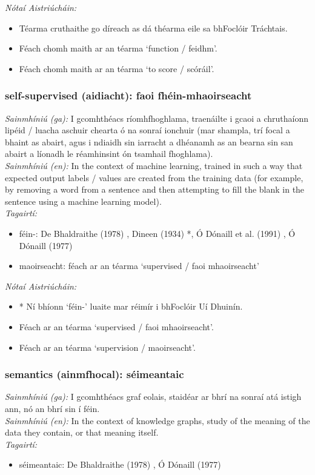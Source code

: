  \noindent \textit{Nótaí Aistriúcháin:}
\begin{itemize}
	\item Téarma cruthaithe go díreach as dá théarma eile sa bhFoclóir Tráchtais.
	\item Féach chomh maith ar an téarma `function / feidhm'.
	\item Féach chomh maith ar an téarma `to score / scóráil'.
\end{itemize}


\subsubsection*{self-supervised (aidiacht): faoi fhéin-mhaoirseacht}
 \noindent \textit{Sainmhíniú (ga):} I gcomhthéacs ríomhfhoghlama, traenáilte i gcaoi a chruthaíonn lipéid / luacha aschuir chearta ó na sonraí ionchuir (mar shampla, trí focal a bhaint as abairt, agus i ndiaidh sin iarracht a dhéanamh as an bearna sin san abairt a líonadh le réamhinsint ón tsamhail fhoghlama).
\\
 \noindent \textit{Sainmhíniú (en):} In the context of machine learning, trained in such a way that expected output labels / values are created from the training data (for example, by removing a word from a sentence and then attempting to fill the blank in the sentence using a machine learning model).
\\
 \noindent \textit{Tagairtí:}
\begin{itemize}
	\item féin-: De Bhaldraithe (1978) \cite{de-bhaldraithe}, Dineen (1934) \cite{dineen}*, Ó Dónaill et al. (1991) \cite{focloir-beag}, Ó Dónaill (1977) \cite{odonaill}
	\item maoirseacht: féach ar an téarma `supervised / faoi mhaoirseacht'
\end{itemize}

 \noindent \textit{Nótaí Aistriúcháin:}
\begin{itemize}
	\item * Ní bhíonn `féin-' luaite mar réimír i bhFoclóir Uí Dhuinín.
	\item Féach ar an téarma `supervised / faoi mhaoirseacht'.
	\item Féach ar an téarma `supervision / maoirseacht'.
\end{itemize}


\subsubsection*{semantics (ainmfhocal): séimeantaic}
 \noindent \textit{Sainmhíniú (ga):} I gcomhthéacs graf eolais, staidéar ar bhrí na sonraí atá istigh ann, nó an bhrí sin í féin.
\\
 \noindent \textit{Sainmhíniú (en):} In the context of knowledge graphs, study of the meaning of the data they contain, or that meaning itself.
\\
 \noindent \textit{Tagairtí:}
\begin{itemize}
	\item séimeantaic: De Bhaldraithe (1978) \cite{de-bhaldraithe}, Ó Dónaill (1977) \cite{odonaill}
\end{itemize}

